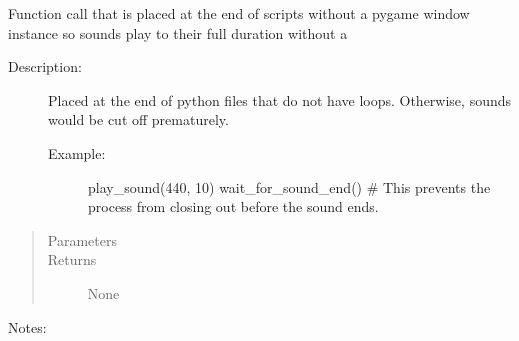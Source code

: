 \documentclass[letterpaper,10pt,english,openany,oneside]{sphinxmanual}
\begin{document}
\begin{fulllineitems}
\begin{fulllineitems}
\label{\detokenize{dpav:dpav.audio.Audio.wait_for_sound_end}}
\sphinxAtStartPar
Function call that is placed at the end of scripts without a pygame window instance so sounds play to their full duration without a
\begin{description}
\item[{Description:}] \leavevmode
\sphinxAtStartPar
Placed at the end of python files that do not have loops. Otherwise, sounds would be cut off prematurely.
\begin{description}
\item[{Example:}] \leavevmode
\sphinxAtStartPar
play\_sound(440, 10)
wait\_for\_sound\_end() \# This prevents the process from closing out before the sound ends.

\end{description}

\end{description}
\begin{quote}\begin{description}
\item[{Parameters}] \leavevmode
\sphinxAtStartPar
{} \textendash{} 

\item[{Returns}] \leavevmode
\sphinxAtStartPar
None

\end{description}\end{quote}

\sphinxAtStartPar
Notes:

\end{fulllineitems}


\end{fulllineitems}

\end{document}
